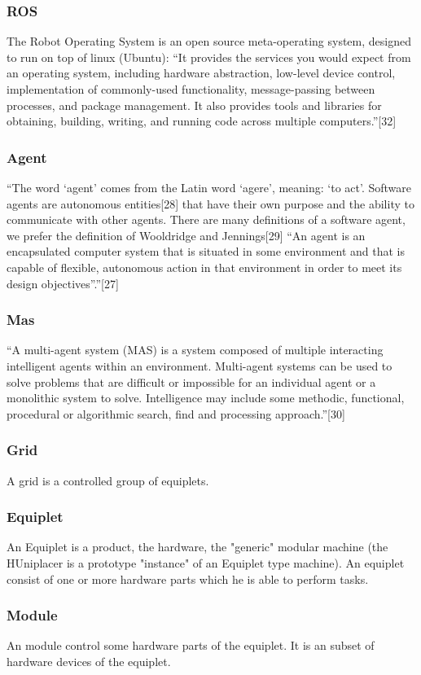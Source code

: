 \documentclass[12pt,a4paper]{report}
\begin{document}
\subsubsection{ROS}
The Robot Operating System is an open source meta-operating system, designed to run on top of linux (Ubuntu): “It provides the services you would expect from an operating system, including hardware abstraction, low-level device control, implementation of commonly-used functionality, message-passing between processes, and package management. It also provides tools and libraries for obtaining, building, writing, and running code across multiple computers.”[32]
\subsubsection{Agent}
“The word ‘agent’ comes from the Latin word ‘agere’, meaning: ‘to act’. Software agents are autonomous entities[28] that have their own purpose and the ability to communicate with other agents. There are many definitions of a software agent, we prefer the definition of Wooldridge and Jennings[29] “An agent is an encapsulated computer system that is situated in some environment and that is capable of flexible, autonomous action in that environment in
order to meet its design objectives”.”[27]
\subsubsection{Mas}
“A multi-agent system (MAS) is a system composed of multiple interacting intelligent agents within an environment. Multi-agent systems can be used to solve problems that are difficult or impossible for an individual agent or a monolithic system to solve. Intelligence may include some methodic, functional, procedural or algorithmic search, find and processing approach.”[30]
\subsubsection{Grid}
A grid is a controlled group of equiplets.
\subsubsection{Equiplet}
An Equiplet is a product, the hardware, the "generic" modular machine (the HUniplacer is a prototype "instance" of an Equiplet type machine). An equiplet consist of one or more hardware parts which he is able to perform tasks.
\subsubsection{Module}
An module control some hardware parts of the equiplet. It is an subset of hardware devices of the equiplet.
\end{document}

